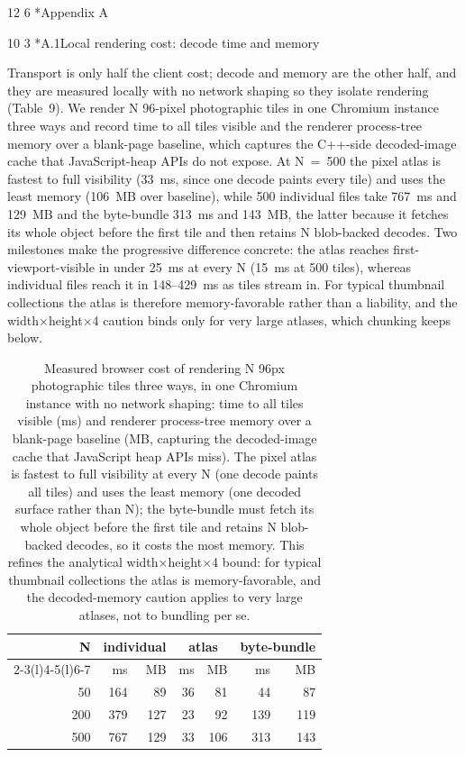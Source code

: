 \documentclass[3p,twocolumn]{elsarticle}
\makeatletter
\renewcommand\section{\@startsection{section}{1}{\z@}%
           {12\p@ \@plus 3\p@ \@minus 4\p@}%
           {6\p@ \@plus 2\p@ \@minus 2\p@}%
           {\normalsize\bfseries\boldmath}}
\renewcommand\subsection{\@startsection{subsection}{2}{\z@}%
           {10\p@ \@plus 3\p@ \@minus 3\p@}%
           {3\p@ \@plus 2\p@ \@minus 1\p@}%
           {\normalfont\normalsize\itshape}}
\makeatother
\begin{document}
\section*{Appendix A}

\subsection*{A.1\quad Local rendering cost: decode time and
memory}

Transport is only half the client cost; decode and memory are the other
half, and they are measured locally with no network shaping so they
isolate rendering (Table~9). We render N 96-pixel photographic tiles in
one Chromium instance three ways and record time to all tiles visible
and the renderer process-tree memory over a blank-page baseline, which
captures the C++-side decoded-image cache that JavaScript-heap APIs do
not expose. At N~=~500 the pixel atlas is fastest to full visibility
(33~ms, since one decode paints every tile) and uses the least memory
(106~MB over baseline), while 500 individual files take 767~ms and
129~MB and the byte-bundle 313~ms and 143~MB, the latter because it
fetches its whole object before the first tile and then retains N
blob-backed decodes. Two milestones make the progressive difference
concrete: the atlas reaches first-viewport-visible in under 25~ms at
every N (15~ms at 500 tiles), whereas individual files reach it in
148--429~ms as tiles stream in. For typical thumbnail collections the
atlas is therefore memory-favorable rather than a liability, and the
width×height×4 caution binds only for very large atlases, which chunking
keeps below.

\begin{table}[t]
\centering
\small
\setlength{\tabcolsep}{4pt}
\begin{tabular}{@{}r rr rr rr@{}}
\toprule
N & \multicolumn{2}{c}{individual} & \multicolumn{2}{c}{atlas} & \multicolumn{2}{c}{byte-bundle} \\ \cmidrule(l){2-3}\cmidrule(l){4-5}\cmidrule(l){6-7}
& ms & MB & ms & MB & ms & MB \\
\midrule
50 & 164 & 89 & 36 & 81 & 44 & 87 \\
200 & 379 & 127 & 23 & 92 & 139 & 119 \\
500 & 767 & 129 & 33 & 106 & 313 & 143 \\
\bottomrule
\end{tabular}
\caption{Measured browser cost of rendering N 96px photographic
tiles three ways, in one Chromium instance with no network shaping: time
to all tiles visible (ms) and renderer process-tree memory over a
blank-page baseline (MB, capturing the decoded-image cache that
JavaScript heap APIs miss). The pixel atlas is fastest to full
visibility at every N (one decode paints all tiles) and uses the least
memory (one decoded surface rather than N); the byte-bundle must fetch
its whole object before the first tile and retains N blob-backed
decodes, so it costs the most memory. This refines the analytical
width×height×4 bound: for typical thumbnail collections the atlas is
memory-favorable, and the decoded-memory caution applies to very large
atlases, not to bundling per se.}

\end{table}
\end{document}
